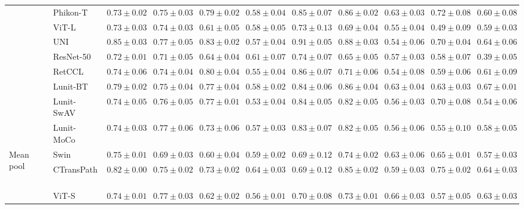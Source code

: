 \begin{tabular}{ll|cccc|c|cccc}
 & Phikon-T~\cite{filiot2023scaling} & $0.73 \pm 0.02$ & $0.75 \pm 0.03$ & $0.79 \pm 0.02$ & $0.58 \pm 0.04$ & $0.85 \pm 0.07$ & $0.86 \pm 0.02$ & $0.63 \pm 0.03$ & $0.72 \pm 0.08$ & $0.60 \pm 0.08$ \\
 & ViT-L~\cite{kolesnikov2021image} & $0.73 \pm 0.03$ & $0.74 \pm 0.03$ & $0.61 \pm 0.05$ & $0.58 \pm 0.05$ & $0.73 \pm 0.13$ & $0.69 \pm 0.04$ & $0.55 \pm 0.04$ & $0.49 \pm 0.09$ & $0.59 \pm 0.03$ \\
 & UNI~\cite{chen2024uni} & $\mathbf{0.85 \pm 0.03}$ & $0.77 \pm 0.05$ & $\mathbf{0.83 \pm 0.02}$ & $0.57 \pm 0.04$ & $\mathbf{0.91 \pm 0.05}$ & $0.88 \pm 0.03$ & $0.54 \pm 0.06$ & $0.70 \pm 0.04$ & $0.64 \pm 0.06$ \\
 & ResNet-50~\cite{he2015deep} & $0.72 \pm 0.01$ & $0.71 \pm 0.05$ & $0.64 \pm 0.04$ & $0.61 \pm 0.07$ & $0.74 \pm 0.07$ & $0.65 \pm 0.05$ & $0.57 \pm 0.03$ & $0.58 \pm 0.07$ & $0.39 \pm 0.05$ \\
 & RetCCL~\cite{wang2023retccl} & $0.74 \pm 0.06$ & $0.74 \pm 0.04$ & $0.80 \pm 0.04$ & $0.55 \pm 0.04$ & $0.86 \pm 0.07$ & $0.71 \pm 0.06$ & $0.54 \pm 0.08$ & $0.59 \pm 0.06$ & $0.61 \pm 0.09$ \\
 & Lunit-BT~\cite{kang2023benchmarking} & $0.79 \pm 0.02$ & $0.75 \pm 0.04$ & $0.77 \pm 0.04$ & $0.58 \pm 0.02$ & $0.84 \pm 0.06$ & $0.86 \pm 0.04$ & $\mathbf{0.63 \pm 0.04}$ & $0.63 \pm 0.03$ & $0.67 \pm 0.01$ \\
 & Lunit-SwAV~\cite{kang2023benchmarking} & $0.74 \pm 0.05$ & $0.76 \pm 0.05$ & $0.77 \pm 0.01$ & $0.53 \pm 0.04$ & $0.84 \pm 0.05$ & $0.82 \pm 0.05$ & $0.56 \pm 0.03$ & $0.70 \pm 0.08$ & $0.54 \pm 0.06$ \\
 & Lunit-MoCo~\cite{kang2023benchmarking} & $0.74 \pm 0.03$ & $0.77 \pm 0.06$ & $0.73 \pm 0.06$ & $0.57 \pm 0.03$ & $0.83 \pm 0.07$ & $0.82 \pm 0.05$ & $0.56 \pm 0.06$ & $0.55 \pm 0.10$ & $0.58 \pm 0.05$ \\
\cline{1-11}
\multirow[t]{14}{*}{Mean pool} & Swin~\cite{liu2021swin} & $0.75 \pm 0.01$ & $0.69 \pm 0.03$ & $0.60 \pm 0.04$ & $0.59 \pm 0.02$ & $0.69 \pm 0.12$ & $0.74 \pm 0.02$ & $0.63 \pm 0.06$ & $0.65 \pm 0.01$ & $0.57 \pm 0.03$ \\
 & CTransPath~\cite{wang2022transformer} & $0.82 \pm 0.00$ & $0.75 \pm 0.02$ & $0.73 \pm 0.02$ & $\mathbf{0.64 \pm 0.03}$ & $0.69 \pm 0.12$ & $0.85 \pm 0.02$ & $0.59 \pm 0.03$ & $0.75 \pm 0.02$ & $0.64 \pm 0.03$ \\
 & ViT-S~\cite{kolesnikov2021image} & $0.74 \pm 0.01$ & $0.77 \pm 0.03$ & $0.62 \pm 0.02$ & $0.56 \pm 0.01$ & $0.70 \pm 0.08$ & $0.73 \pm 0.01$ & $\mathbf{0.66 \pm 0.03}$ & $0.57 \pm 0.05$ & $0.63 \pm 0.03$ \\

\end{tabular}
